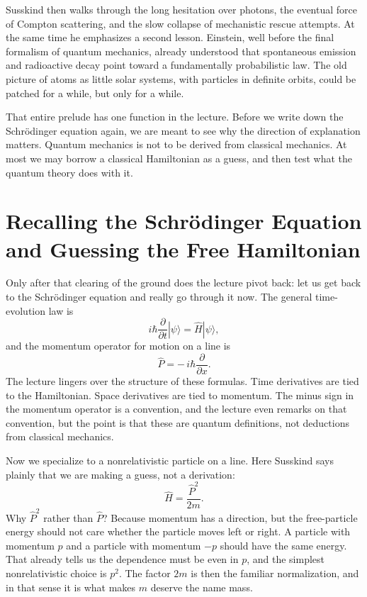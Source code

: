 Susskind then walks through the long hesitation over photons, the eventual force of Compton scattering, and the slow collapse of mechanistic rescue attempts. At the same time he emphasizes a second lesson. Einstein, well before the final formalism of quantum mechanics, already understood that spontaneous emission and radioactive decay point toward a fundamentally probabilistic law. The old picture of atoms as little solar systems, with particles in definite orbits, could be patched for a while, but only for a while.

That entire prelude has one function in the lecture. Before we write down the Schr\"odinger equation again, we are meant to see why the direction of explanation matters. Quantum mechanics is not to be derived from classical mechanics. At most we may borrow a classical Hamiltonian as a guess, and then test what the quantum theory does with it.

\section{Recalling the Schr\"odinger Equation and Guessing the Free Hamiltonian}

Only after that clearing of the ground does the lecture pivot back: let us get back to the Schr\"odinger equation and really go through it now. The general time-evolution law is
\begin{equation}
i\hbar \frac{\partial}{\partial t} |\psi\rangle = \hat H |\psi\rangle,
\end{equation}
and the momentum operator for motion on a line is
\begin{equation}
\hat P = -\,i\hbar \frac{\partial}{\partial x}.
\end{equation}
The lecture lingers over the structure of these formulas. Time derivatives are tied to the Hamiltonian. Space derivatives are tied to momentum. The minus sign in the momentum operator is a convention, and the lecture even remarks on that convention, but the point is that these are quantum definitions, not deductions from classical mechanics.

Now we specialize to a nonrelativistic particle on a line. Here Susskind says plainly that we are making a guess, not a derivation:
\begin{equation}
\hat H = \frac{\hat P^2}{2m}.
\end{equation}
Why \(\hat P^2\) rather than \(\hat P\)? Because momentum has a direction, but the free-particle energy should not care whether the particle moves left or right. A particle with momentum \(p\) and a particle with momentum \(-p\) should have the same energy. That already tells us the dependence must be even in \(p\), and the simplest nonrelativistic choice is \(p^2\). The factor \(2m\) is then the familiar normalization, and in that sense it is what makes \(m\) deserve the name mass.

